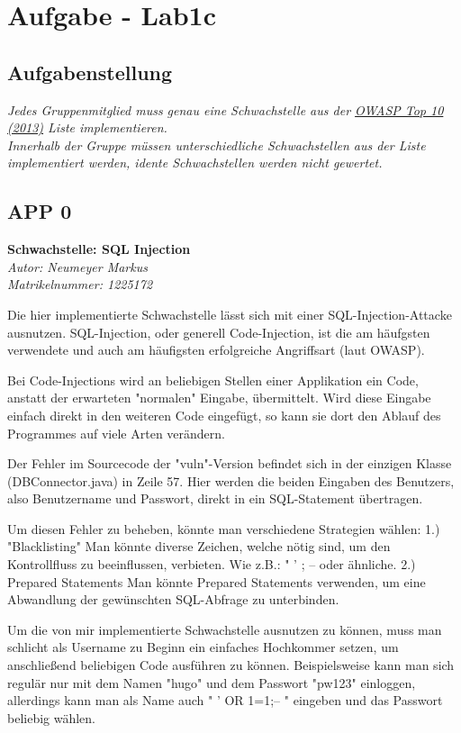 \documentclass[12pt,a4paper,titlepage,oneside]{scrartcl}
\begin{document}
\section{Aufgabe - Lab1c}

\subsection{Aufgabenstellung}
\emph{Jedes Gruppenmitglied muss genau eine Schwachstelle aus der \href{https://www.owasp.org/index.php/Top_10_2013-Top_10}{OWASP Top 10 (2013)} Liste implementieren.\\ Innerhalb der Gruppe müssen unterschiedliche Schwachstellen aus der Liste implementiert werden, idente Schwachstellen werden nicht gewertet.}

\subsection{APP 0}
\textbf{{\large Schwachstelle:} SQL Injection }\\
\emph{Autor: Neumeyer Markus\\Matrikelnummer: 1225172}

Die hier implementierte Schwachstelle lässt sich mit einer SQL-Injection-Attacke ausnutzen.
SQL-Injection, oder generell Code-Injection, ist die am häufgsten verwendete und auch am
häufigsten erfolgreiche Angriffsart (laut OWASP).

Bei Code-Injections wird an beliebigen Stellen einer Applikation ein Code, anstatt der
erwarteten "normalen" Eingabe, übermittelt. Wird diese Eingabe einfach direkt in den 
weiteren Code eingefügt, so kann sie dort den Ablauf des Programmes auf viele Arten
verändern.

Der Fehler im Sourcecode der "vuln"-Version befindet sich in der einzigen Klasse
(DBConnector.java) in Zeile 57. Hier werden die beiden Eingaben des Benutzers, also
Benutzername und Passwort, direkt in ein SQL-Statement übertragen.

Um diesen Fehler zu beheben, könnte man verschiedene Strategien wählen:
1.) "Blacklisting"
	Man könnte diverse Zeichen, welche nötig sind, um den Kontrollfluss zu
	beeinflussen, verbieten. Wie z.B.: " ' ; -- oder ähnliche.
2.) Prepared Statements
	Man könnte Prepared Statements verwenden, um eine Abwandlung der gewünschten
	SQL-Abfrage zu unterbinden.

Um die von mir implementierte Schwachstelle ausnutzen zu können, muss man schlicht als
Username zu Beginn ein einfaches Hochkommer setzen, um anschließend beliebigen Code
ausführen zu können.
Beispielsweise kann man sich regulär nur mit dem Namen "hugo" und dem Passwort "pw123"
einloggen, allerdings kann man als Name auch " ' OR 1=1;-- " eingeben und das Passwort
beliebig wählen.
\end{document}
